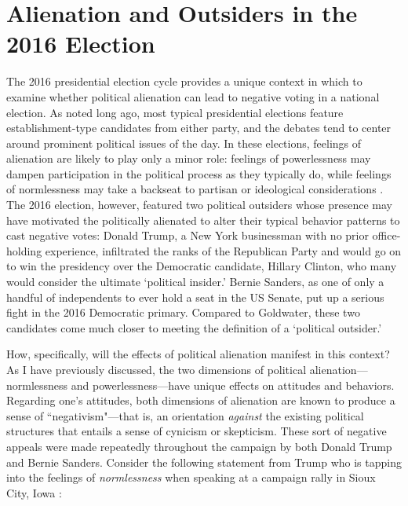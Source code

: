 \documentclass[12pt]{article}
\begin{document}

\section{Alienation and Outsiders in the 2016 Election}\label{sec:theory}
The 2016 presidential election cycle provides a unique context in which to examine whether political alienation can lead to negative voting in a national election. As \textcite{templeton1966} noted long ago, most typical presidential elections feature establishment-type candidates from either party, and the debates tend to center around prominent political issues of the day. In these elections, feelings of alienation are likely to play only a minor role: feelings of powerlessness may dampen participation in the political process  as they typically do, while feelings of normlessness may take a backseat to partisan or ideological considerations \parencite{finifter1970dimensions}. The 2016 election, however, featured two political outsiders whose presence may have motivated the politically alienated to alter their typical behavior patterns to cast negative votes: Donald Trump, a New York businessman with no prior office-holding experience, infiltrated the ranks of the Republican Party and would go on to win the presidency over the Democratic candidate, Hillary Clinton, who many would consider the ultimate `political insider.' Bernie Sanders, as one of only a handful of independents to ever hold a seat in the US Senate, put up a serious fight in the 2016 Democratic primary. Compared to Goldwater, these two candidates come much closer to meeting the definition of a `political outsider.'

How, specifically, will the effects of political alienation manifest in this context? As I have previously discussed, the two dimensions of political alienation---normlessness and powerlessness---have unique effects on attitudes and behaviors. Regarding one's attitudes, both dimensions of alienation are known to produce a sense of ``negativism"---that is, an orientation \textit{against} the existing political structures that entails a sense of cynicism or skepticism. These sort of negative appeals were made repeatedly throughout the campaign by both Donald Trump and Bernie Sanders. Consider the following statement from Trump who is tapping into the feelings of \textit{normlessness} when speaking at a campaign rally in Sioux City, Iowa \parencite{Jackson2016}:
\end{document}
